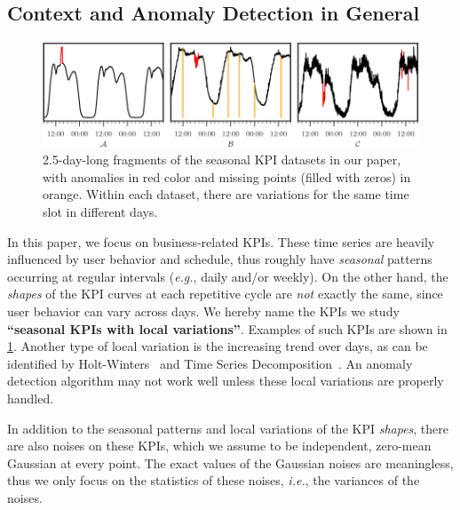 \documentclass[sigconf]{acmart}
\newcommand\devcomment[1]{\textcolor{red}{***{#1}***}}
\newcommand\devcomment[1]{}
\newcommand{\IE}{\textit{i.e.}}
\newcommand{\EG}{\textit{e.g.}}
\begin{document}
\subsection{Context and Anomaly Detection in General}
\label{sec:focus-of-this-paper}

\begin{figure}
	\centering
	\includegraphics[width=\columnwidth]{kpi}
	\caption{
		2.5-day-long fragments of the seasonal KPI datasets in our paper, with anomalies in red color and missing points (filled with zeros) in orange. Within each dataset, there are variations for the same time slot in different days.
	}
	\label{fig:kpi}
\end{figure}

In this paper, we focus on business-related KPIs. These time series  are heavily influenced by user behavior and schedule, thus roughly have \textit{seasonal} patterns occurring at regular intervals (\EG, daily and/or weekly). On the other hand, the \textit{shapes} of the KPI curves at each repetitive cycle are \textit{not}  exactly the same, since user behavior can vary across days. We hereby name the KPIs we study \textbf{``seasonal KPIs with local variations''}. Examples of such KPIs are shown in \cref{fig:kpi}. Another type of local variation is the increasing trend over days, as can be identified by Holt-Winters~\cite{holt-winters} and Time Series Decomposition~\cite{TSD}.
An anomaly detection algorithm may not work well unless these local variations are properly handled.

In addition to the seasonal patterns and local variations of the KPI \textit{shapes}, there are also noises on these KPIs, which we assume to be independent, zero-mean Gaussian at every point.
The exact values of the Gaussian noises are meaningless, thus we only focus on the statistics of these noises, \IE, the variances of the noises.
\end{document}
